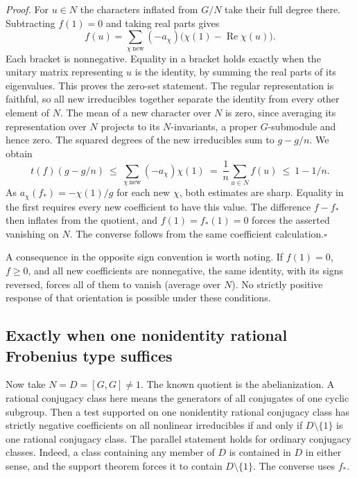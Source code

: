 \smallskip\noindent\emph{Proof.}
For $u\in N$ the characters inflated from $G/N$ take their full degree
there. Subtracting $f(1)=0$ and taking real parts gives
\[
  f(u)=\sum_{\chi\ \mathrm{new}}(-a_\chi)
                 \bigl(\chi(1)-\operatorname{Re}\chi(u)\bigr).
\]
Each bracket is nonnegative. Equality in a bracket holds exactly when
the unitary matrix representing $u$ is the identity, by summing the real
parts of its eigenvalues. This proves the zero-set statement.
The regular representation is faithful, so all new irreducibles
together separate the identity from every other element of $N$.
The mean of a new character over $N$ is zero, since averaging its
representation over $N$ projects to its $N$-invariants, a proper
$G$-submodule and hence zero. The squared degrees of the new
irreducibles sum to $g-g/n$. We obtain
\[
 t(f)(g-g/n)
 \ \le\ \sum_{\chi\ \mathrm{new}} (-a_\chi)\chi(1)
 \ =\ \frac1n\sum_{u\in N} f(u)\ \le\ 1-1/n.
\]
As $a_\chi(f_*)=-\chi(1)/g$ for each new $\chi$, both estimates are
sharp. Equality in the first requires every new coefficient to have
this value. The difference $f-f_*$ then inflates from the quotient,
and $f(1)=f_*(1)=0$ forces the asserted vanishing on $N$. The converse
follows from the same coefficient calculation.\hfill$\square$

A consequence in the opposite sign convention is worth noting. If
$f(1)=0$, $f\ge0$, and all new coefficients are nonnegative, the same
identity, with its signs reversed, forces all of them to vanish
(average over $N$). No strictly positive response of that orientation
is possible under these conditions.

\subsection*{Exactly when one nonidentity rational Frobenius type suffices}
Now take $N=D=[G,G]\ne1$. The known quotient is the abelianization.
A rational conjugacy class here means the generators of all conjugates
of one cyclic subgroup. Then a test supported on one nonidentity
rational conjugacy class has strictly negative coefficients on all
nonlinear irreducibles if and only if $D\setminus\{1\}$ is one rational
conjugacy class. The parallel statement holds for ordinary conjugacy
classes. Indeed, a class containing any member of $D$ is contained in
$D$ in either sense, and the support theorem forces it to contain
$D\setminus\{1\}$. The converse uses $f_*$.

